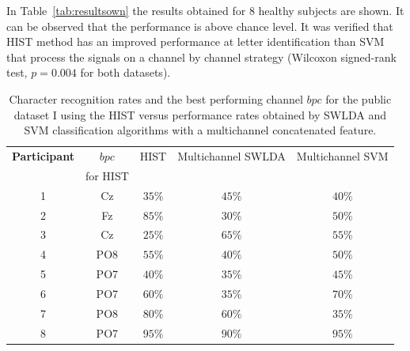 In Table~\ref{tab:resultsown} the results obtained for 8 healthy subjects are shown.  It can be observed that the performance is above chance level. It was verified that HIST method has an improved performance at letter identification than SVM that process the signals on a channel by channel strategy (Wilcoxon signed-rank test, $p =  0.004$ for both datasets).


\begin{table}[h!]
\caption[Dataset I - Comparisons of Character Recognition Rates]{Character recognition rates and the best performing channel $bpc$ for the public dataset I  using the HIST versus performance rates obtained by SWLDA and SVM classification algorithms with a multichannel concatenated feature.}
\centering
\begin{tabular}{c|cc|c|c}
\toprule
\textbf{Participant}	&  $bpc$	&  HIST & Multichannel SWLDA & Multichannel SVM \\
                                    &  for HIST        &           &                                       &   \\
\midrule
1     &     Cz   &   $35\%$  & $45\%$  & $40\%$\\
2     &     Fz   &   $85\%$  & $30\%$   & $50\%$   \\
3     &     Cz   &   $25\%$  & $65\%$ & $55\%$   \\
4     &     PO8 &   $55\%$ & $40\%$  & $50\%$   \\
5     &     PO7 &   $40\%$ & $35\%$  & $45\%$   \\
6     &     PO7 &   $60\%$ &  $35\%$  & $70\%$   \\
7     &     PO8 &   $80\%$ & $60\%$   & $35\%$   \\
8     &     PO7 &   $95\%$  & $90\%$   & $95\%$  \\

\end{tabular}
\label{tab:resultsalsswlda}
\end{table}


